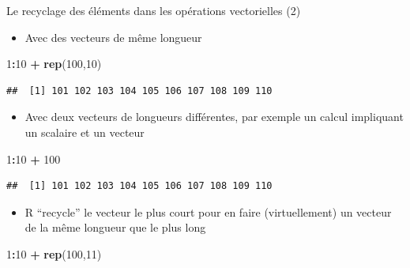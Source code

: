 \documentclass[
  ignorenonframetext,
]{beamer}
\newenvironment{Shaded}{\begin{snugshade}}{\end{snugshade}}
\newcommand{\DecValTok}[1]{\textcolor[rgb]{0.00,0.00,0.81}{#1}}
\newcommand{\FunctionTok}[1]{\textcolor[rgb]{0.13,0.29,0.53}{\textbf{#1}}}
\newcommand{\NormalTok}[1]{#1}
\newcommand{\SpecialCharTok}[1]{\textcolor[rgb]{0.81,0.36,0.00}{\textbf{#1}}}
\providecommand{\tightlist}{%
  \setlength{\itemsep}{0pt}\setlength{\parskip}{0pt}}
\begin{document}
\begin{frame}[fragile]{Le recyclage des éléments dans les opérations
vectorielles (2)}
\protect\hypertarget{le-recyclage-des-uxe9luxe9ments-dans-les-opuxe9rations-vectorielles-2}{}
\begin{itemize}
\tightlist
\item
  Avec des vecteurs de même longueur
\end{itemize}

\tiny

\begin{Shaded}
\begin{Highlighting}[]
\DecValTok{1}\SpecialCharTok{:}\DecValTok{10} \SpecialCharTok{+} \FunctionTok{rep}\NormalTok{(}\DecValTok{100}\NormalTok{,}\DecValTok{10}\NormalTok{)}
\end{Highlighting}
\end{Shaded}

\begin{verbatim}
##  [1] 101 102 103 104 105 106 107 108 109 110
\end{verbatim}

\normalsize

\begin{itemize}
\tightlist
\item
  Avec deux vecteurs de longueurs différentes, par exemple un calcul
  impliquant un scalaire et un vecteur
\end{itemize}

\tiny

\begin{Shaded}
\begin{Highlighting}[]
\DecValTok{1}\SpecialCharTok{:}\DecValTok{10} \SpecialCharTok{+} \DecValTok{100}
\end{Highlighting}
\end{Shaded}

\begin{verbatim}
##  [1] 101 102 103 104 105 106 107 108 109 110
\end{verbatim}

\normalsize

\begin{itemize}
\tightlist
\item
  R ``recycle'' le vecteur le plus court pour en faire (virtuellement)
  un vecteur de la même longueur que le plus long
\end{itemize}

\tiny

\begin{Shaded}
\begin{Highlighting}[]
\DecValTok{1}\SpecialCharTok{:}\DecValTok{10} \SpecialCharTok{+} \FunctionTok{rep}\NormalTok{(}\DecValTok{100}\NormalTok{,}\DecValTok{11}\NormalTok{)}
\end{Highlighting}
\end{Shaded}


\end{frame}
\end{document}
